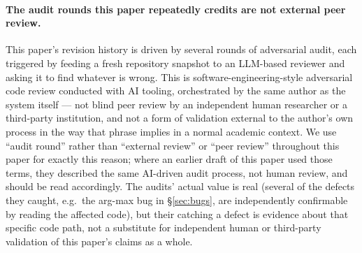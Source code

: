 \paragraph{The audit rounds this paper repeatedly credits are not
external peer review.} This paper's revision history is driven by
several rounds of adversarial audit, each triggered by feeding a fresh
repository snapshot to an LLM-based reviewer and asking it to find
whatever is wrong. This is software-engineering-style adversarial code
review conducted with AI tooling, orchestrated by the same author as
the system itself --- not blind peer review by an independent human
researcher or a third-party institution, and not a form of validation
external to the author's own process in the way that phrase implies in
a normal academic context. We use ``audit round'' rather than
``external review'' or ``peer review'' throughout this paper for
exactly this reason; where an earlier draft of this paper used those
terms, they described the same AI-driven audit process, not human
review, and should be read accordingly. The audits' actual value is
real (several of the defects they caught, e.g.\ the arg-max bug in
\S\ref{sec:bugs}, are independently confirmable by reading the affected
code), but their catching a defect is evidence about that specific
code path, not a substitute for independent human or third-party
validation of this paper's claims as a whole.

